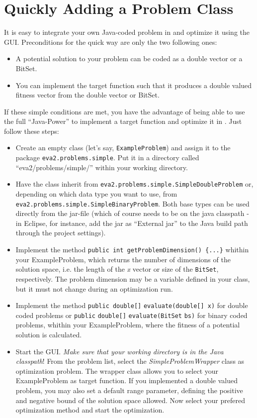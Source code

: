 \chapter{Quickly Adding a Problem Class\label{sec:Quickly-Adding-Your-Problem}}

It is easy to integrate your own Java-coded problem in 
and optimize it using the GUI. Preconditions for the quick way are
only the two following ones:
%
\begin{itemize}
	\item A potential solution to your problem can be coded as a double vector
or a BitSet.
	\item You can implement the target function such that it produces a double
valued fitness vector from the double vector or BitSet.
\end{itemize}
%
If these simple conditions are met, you have the advantage of being
able to use the full ``Java-Power'' to implement a target function
and optimize it in . Just follow these steps:
%
\begin{itemize}
	\item Create an empty class (let's say, \texttt{ExampleProblem}) and assign it to the package \texttt{eva2.problems.simple}. Put it in a directory called ``eva2/problems/simple/'' within your working directory.
	\item Have the class inherit from \texttt{eva2.problems.simple.SimpleDoubleProblem} or, depending on which data type you want to use, from \texttt{eva2.problems.simple.Simple\-Binary\-Problem}.
Both base types can be used directly from the  jar-file
(which of course needs to be on the java classpath - in Eclipse, for
instance, add the  jar as ``External jar'' to the Java
build path through the project settings).
	\item Implement the method \texttt{public int getProblemDimension() \{...\}}
whithin your ExampleProblem, which returns the number of dimensions
of the solution space, i.e. the length of the \emph{x} vector or size
of the \texttt{BitSet}, respectively. The problem dimension may be
a variable defined in your class, but it must not change during an
optimization run.
	\item Implement the method \texttt{public double{[}{]}} \texttt{evaluate(double{[}{]}
x)} for double coded problems or \texttt{public} \texttt{double{[}{]}}
\texttt{evaluate(BitSet} \texttt{bs)} for binary coded problems, whithin
your ExampleProblem, where the fitness of a potential solution is
calculated.
	\item Start the  GUI. \emph{Make sure that your working directory
is in the Java classpath}! From the problem list, select the \emph{SimpleProblemWrapper}
class as optimization problem. The wrapper class allows you to select
your ExampleProblem as target function. If you implemented a double
valued problem, you may also set a default range parameter, defining
the positive and negative bound of the solution space allowed. Now
select your prefered optimization method and start the optimization.
\end{itemize}